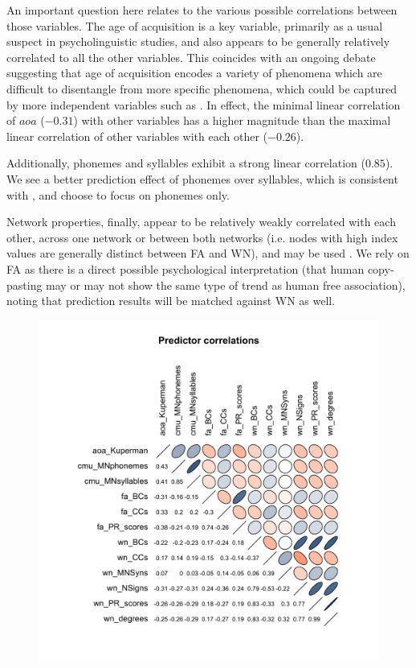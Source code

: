 An important question here relates to the various possible correlations between those variables.  The age of acquisition is a key variable, primarily as a usual suspect in psycholinguistic studies, and also appears to be generally relatively correlated to all the other variables.  This coincides with an ongoing debate suggesting that age of acquisition encodes a variety of phenomena which are difficult to disentangle from more specific phenomena, which could be captured by more independent variables such as \CN.
In effect, the minimal linear correlation of $aoa$ ($-0.31$) with other variables has a higher magnitude than the maximal linear correlation of other variables with each other ($-0.26$).

Additionally, phonemes and syllables exhibit a strong linear correlation ($0.85$).  We see a better prediction effect of phonemes over syllables, which is consistent with \cite{nick-diss}, and choose to focus on phonemes only. 

\bigskip
Network properties, finally, appear to be relatively weakly correlated with each other, across one network or between both networks (i.e. nodes with high index values are generally distinct between FA and WN), and may be used . We rely on FA as there is a direct possible psychological interpretation (that human copy-pasting may or may not show the same type of trend as human free association), noting that prediction results will be matched against WN as well. 

\begin{figure}[!th]
\includegraphics[width=\linewidth]{algorithms/Rplot.pdf}
\end{figure}

